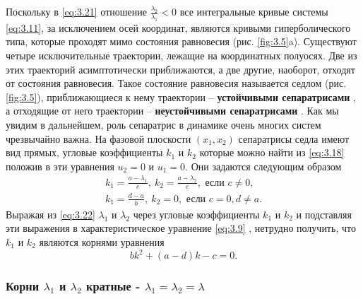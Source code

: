 Поскольку в \eqref{eq:3.21} отношение $\frac{\lambda_2}{\lambda_1}<0$
все интегральные кривые системы \eqref{eq:3.11},
за исключением осей координат, являются кривыми гиперболического типа, которые проходят мимо состояния равновесия (рис. \ref{fig:3.5}a). 
Существуют
четыре исключительные траектории, лежащие на координатных
полуосях. Две из этих траекторий асимптотически приближаются, а две другие,
наоборот, отходят от состояния равновесия. Такое состояние равновесия
называется седлом (рис.\ref{fig:3.5}), приближающиеся к нему траектории --
\textbf{устойчивыми сепаратрисами} , а отходящие от него траектории --
\textbf{неустойчивыми сепаратрисами} . Как мы увидим в дальнейшем, роль
сепаратрис в динамике очень многих систем чрезвычайно важна. На фазовой
плоскости $(x_1,x_2)$ сепаратрисы седла имеют вид прямых, угловые
коэффициенты  $k_{1}$ и $k_2$   которые можно найти из \eqref{eq:3.18}  положив в эти
уравнения $u_2=0$ и $u_1=0$. Они задаются следующим образом
\begin{equation}
        \label{eq:3.22}
        \begin{aligned}
                k_1 = \frac{a-\lambda_1}{c}, ~ k_2= \frac{a-\lambda_2}{c}, \text{ если } c\neq 0,\\
                k_1 = \frac{d-a}{b}, ~k_2=0, \text{ если } c=0, d\neq a.
        \end{aligned}
\end{equation}
Выражая из \eqref{eq:3.22} $\lambda_1$ и $\lambda_2$ через угловые коэффициенты $k_1$ и $k_2$ и подставляя эти выражения в характеристическое уравнение \eqref{eq:3.9} , нетрудно получить, что 
$k_1$ и $k_2$ являются корнями уравнения
\begin{equation}
        \label{eq:3.23}
        bk^2 +(a-d) k -c =0. 
\end{equation}

\subsubsection{Корни $\lambda_1$ и $\lambda_2$ кратные - $\lambda_1=\lambda_2=\lambda$}%
\label{ssub:_korni_lambda_1_i_lambda_2_kratnye}


